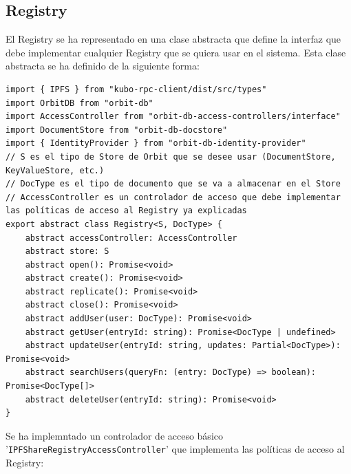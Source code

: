 \subsection{Registry}

El Registry se ha representado en una clase abstracta que define la interfaz que debe implementar cualquier Registry que se quiera usar en el sistema. Esta clase abstracta se ha definido de la siguiente forma:
\begin{verbatim}
import { IPFS } from "kubo-rpc-client/dist/src/types"
import OrbitDB from "orbit-db"
import AccessController from "orbit-db-access-controllers/interface"
import DocumentStore from "orbit-db-docstore"
import { IdentityProvider } from "orbit-db-identity-provider"
// S es el tipo de Store de Orbit que se desee usar (DocumentStore, KeyValueStore, etc.)
// DocType es el tipo de documento que se va a almacenar en el Store
// AccessController es un controlador de acceso que debe implementar las políticas de acceso al Registry ya explicadas
export abstract class Registry<S, DocType> {
    abstract accessController: AccessController
    abstract store: S
    abstract open(): Promise<void> 
    abstract create(): Promise<void>
    abstract replicate(): Promise<void>
    abstract close(): Promise<void>
    abstract addUser(user: DocType): Promise<void>
    abstract getUser(entryId: string): Promise<DocType | undefined>
    abstract updateUser(entryId: string, updates: Partial<DocType>): Promise<void>
    abstract searchUsers(queryFn: (entry: DocType) => boolean): Promise<DocType[]>
    abstract deleteUser(entryId: string): Promise<void>
}
\end{verbatim}
Se ha implemntado un controlador de acceso básico \\'\texttt{IPFShareRegistryAccessController}' que implementa las políticas de acceso al
Registry:

